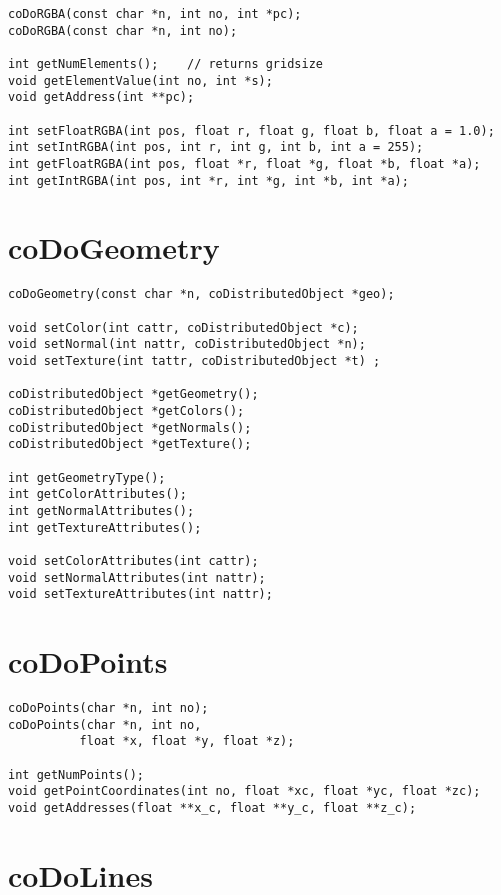 \begin{verbatim}
coDoRGBA(const char *n, int no, int *pc);
coDoRGBA(const char *n, int no);
 
int getNumElements();    // returns gridsize
void getElementValue(int no, int *s);
void getAddress(int **pc);                 
 
int setFloatRGBA(int pos, float r, float g, float b, float a = 1.0);
int setIntRGBA(int pos, int r, int g, int b, int a = 255);
int getFloatRGBA(int pos, float *r, float *g, float *b, float *a);
int getIntRGBA(int pos, int *r, int *g, int *b, int *a);
\end{verbatim}
 

\section{coDoGeometry}

\begin{verbatim} 
coDoGeometry(const char *n, coDistributedObject *geo);
 
void setColor(int cattr, coDistributedObject *c);
void setNormal(int nattr, coDistributedObject *n);
void setTexture(int tattr, coDistributedObject *t) ;
      
coDistributedObject *getGeometry();
coDistributedObject *getColors();
coDistributedObject *getNormals();
coDistributedObject *getTexture();
 
int getGeometryType();
int getColorAttributes();
int getNormalAttributes();
int getTextureAttributes();
 
void setColorAttributes(int cattr);
void setNormalAttributes(int nattr);
void setTextureAttributes(int nattr);
\end{verbatim}


\section{coDoPoints} 

\begin{verbatim}
coDoPoints(char *n, int no);
coDoPoints(char *n, int no,
          float *x, float *y, float *z);
 
int getNumPoints();
void getPointCoordinates(int no, float *xc, float *yc, float *zc);
void getAddresses(float **x_c, float **y_c, float **z_c);
\end{verbatim}


\section{coDoLines}

